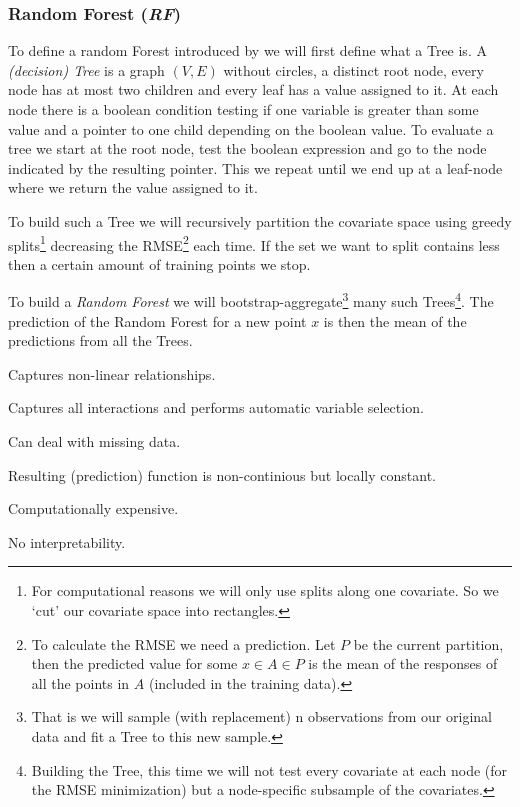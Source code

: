 \subsubsection*{Random Forest (\textit{RF})}{
    To define a random Forest introduced by \cite{breimanRandomForests2001}  we will first define what a Tree is. A \textit{(decision) Tree} is a graph $(V,E)$ without circles, a distinct root node, every node has at most two children and every leaf has a value assigned to it. At each node there is a boolean condition testing if one variable is greater than some value and a pointer to one child depending on the boolean value. To evaluate a tree we start at the root node, test the boolean expression and go to the node indicated by the resulting pointer. This we repeat until we end up at a leaf-node where we return the value assigned to it. 
    
    To build such a Tree we will recursively partition the covariate space using greedy splits\footnote{For computational reasons we will only use splits along one covariate. So we `cut' our covariate space into rectangles.} decreasing the RMSE\footnote{To calculate the RMSE we need a prediction. Let $P$ be the current partition, then the predicted value for some $x\in A \in P$ is the mean of the responses of all the points in $A$ (included in the training data).} each time. If the set we want to split contains less then a certain amount of training points we stop.
    
    To build a \textit{Random Forest} we will bootstrap-aggregate\footnote{That is we will sample (with replacement) n observations from our original data and fit a Tree to this new sample.} many such Trees\footnote{Building the Tree, this time we will not test every covariate at each node (for the RMSE minimization) but a node-specific subsample of the covariates.}. The prediction of the Random Forest for a new point $x$ is then the mean of the predictions from all the Trees. 
    \begin{my_pros_cons_table}{
        \item Captures non-linear relationships.
        \item Captures all interactions and performs automatic variable selection.
        \item Can deal with missing data.
    }{
        \item Resulting (prediction) function is non-continious but locally constant.
        \item Computationally expensive.
        \item No interpretability.
    }
    \end{my_pros_cons_table}
}
